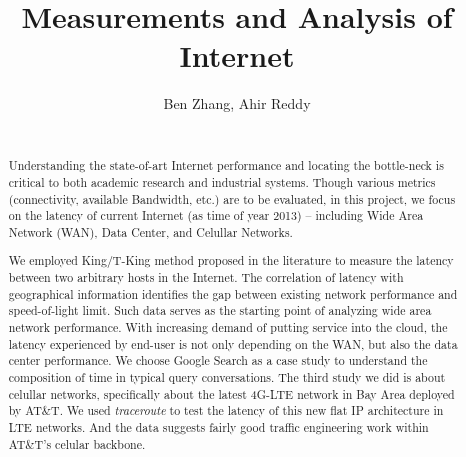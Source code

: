 \documentclass{sig-alternate}
\begin{document}


\setlength{\paperheight}{11in}
\setlength{\paperwidth}{8.5in}
\setlength{\pdfpageheight}{\paperheight}
\setlength{\pdfpagewidth}{\paperwidth}

\title{Measurements and Analysis of Internet}

\author{
{Ben Zhang, Ahir Reddy}\\
\\
}

\maketitle

\begin{abstract}
Understanding the state-of-art Internet performance and locating the bottle-neck is critical to both academic research and industrial systems. Though various metrics (connectivity, available Bandwidth, etc.) are to be evaluated, in this project, we focus on the latency of current Internet (as time of year 2013) -- including Wide Area Network (WAN), Data Center, and Celullar Networks. 

We employed King/T-King method proposed in the literature to measure the latency between two arbitrary hosts in the Internet. The correlation of latency with geographical information identifies the gap between existing network performance and speed-of-light limit. Such data serves as the starting point of analyzing wide area network performance. With increasing demand of putting service into the cloud, the latency experienced by end-user is not only depending on the WAN, but also the data center performance. We choose Google Search as a case study to understand the composition of time in typical query conversations. The third study we did is about celullar networks, specifically about the latest 4G-LTE network in Bay Area deployed by AT\&T. We used {\it traceroute} to test the latency of this new flat IP architecture in LTE networks. And the data suggests fairly good traffic engineering work within AT\&T's celular backbone.

\end{abstract}
\end{document}
